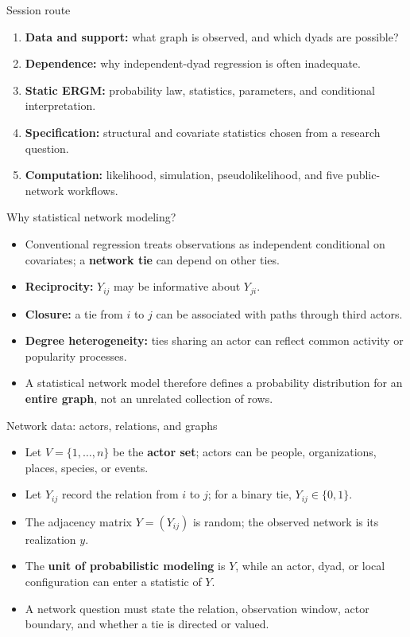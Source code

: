 \documentclass[aspectratio=169,11pt]{beamer}
\newcommand{\term}[1]{\textbf{\color{nupurple}#1}}
\begin{document}
\begin{frame}{Session route}
\begin{enumerate}
\item \term{Data and support:} what graph is observed, and which dyads are possible?
\item \term{Dependence:} why independent-dyad regression is often inadequate.
\item \term{Static ERGM:} probability law, statistics, parameters, and conditional interpretation.
\item \term{Specification:} structural and covariate statistics chosen from a research question.
\item \term{Computation:} likelihood, simulation, pseudolikelihood, and five public-network workflows.
\end{enumerate}
\end{frame}

\begin{frame}{Why statistical network modeling?}
\begin{itemize}
\item Conventional regression treats observations as independent conditional on covariates; a \term{network tie} can depend on other ties.
\item \term{Reciprocity:} $Y_{ij}$ may be informative about $Y_{ji}$.
\item \term{Closure:} a tie from $i$ to $j$ can be associated with paths through third actors.
\item \term{Degree heterogeneity:} ties sharing an actor can reflect common activity or popularity processes.
\item A statistical network model therefore defines a probability distribution for an \term{entire graph}, not an unrelated collection of rows.
\end{itemize}
\end{frame}

\begin{frame}{Network data: actors, relations, and graphs}
\begin{itemize}
\item Let $V=\{1,\ldots,n\}$ be the \term{actor set}; actors can be people, organizations, places, species, or events.
\item Let $Y_{ij}$ record the relation from $i$ to $j$; for a binary tie, $Y_{ij}\in\{0,1\}$.
\item The adjacency matrix $Y=(Y_{ij})$ is random; the observed network is its realization $y$.
\item The \term{unit of probabilistic modeling} is $Y$, while an actor, dyad, or local configuration can enter a statistic of $Y$.
\item A network question must state the relation, observation window, actor boundary, and whether a tie is directed or valued.
\end{itemize}
\end{frame}
\end{document}

